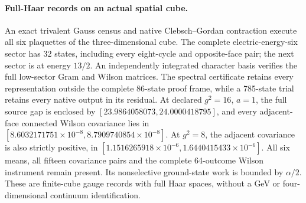\paragraph{Full-Haar records on an actual spatial cube.}
An exact trivalent Gauss census and native Clebsch--Gordan contraction
execute all six plaquettes of the three-dimensional cube.  The complete
electric-energy-six sector has 32 states, including every eight-cycle
and opposite-face pair; the next sector is at energy $13/2$.
An independently integrated character basis verifies the full low-sector
Gram and Wilson matrices.  The spectral certificate retains every
representation outside the complete 86-state proof frame, while a
785-state trial retains every native output in its residual.
At declared $g^2=16$, $a=1$, the full source gap is enclosed by
$[23.9864058073,24.0000418795]$, and every adjacent-face connected
Wilson covariance lies in
$[8.6032171751\times10^{-8},8.7909740854\times10^{-8}]$.
At $g^2=8$, the adjacent covariance is also strictly positive, in
$[1.1516265918\times10^{-6},1.6440415433\times10^{-6}]$.
All six means, all fifteen covariance pairs and the complete 64-outcome
Wilson instrument remain present.  Its nonselective ground-state work
is bounded by $\alpha/2$.  These are finite-cube gauge records with full
Haar spaces, without a GeV or four-dimensional continuum identification.

